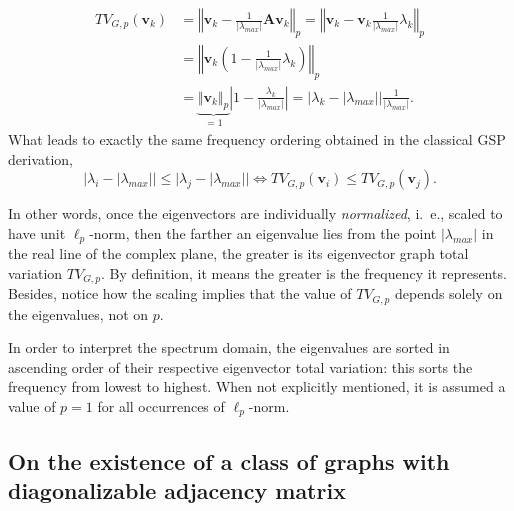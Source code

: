 \begin{equation}
    \begin{aligned}
        TV_{G, p}(\mathbf{v}_k) & =
        \left\Vert \mathbf{v}_k - \frac{1}{|\lambda_{max}|} \mathbf{A} \mathbf{v}_k \right\Vert_p =
        \left\Vert\mathbf{v}_k - \mathbf{v}_k \frac{1}{|\lambda_{max}|} \lambda_k \right\Vert_p                                  \\
                                & = \left\Vert\mathbf{v}_k \left( 1 -  \frac{1}{|\lambda_{max}|} \lambda_k \right) \right\Vert_p \\
                                & =
        \underbrace{\Vert \mathbf{v}_k \Vert_p}_{= 1} \left|1 - \frac{\lambda_k}{|\lambda_{max}|}\right| = \Big| \lambda_k - |\lambda_{max}| \Big| \frac{1}{|\lambda_{max}|}.
    \end{aligned}
\end{equation}
What leads to exactly the same frequency ordering obtained in the classical GSP derivation,
\begin{equation}
    \label{eq:TV_ordering_q}
    \Big| \! \lambda_i  - \! |\lambda_{max}|\Big| \! \leq \! \Big|  \lambda_j  - \! |\lambda_{max}|\Big| \! \! \iff \! \! TV_{G, p}(\mathbf{v}_i) \leq TV_{G, p}(\mathbf{v}_j).
\end{equation}

In other words, once the eigenvectors are individually \textit{normalized}, i.~e., scaled to have unit $\ell_p$-norm, then the farther an eigenvalue lies from the point $|\lambda_{max}|$ in the real line of the complex plane, the greater is its eigenvector graph total variation $TV_{G, p}$. By definition, it means the greater is the frequency it represents. Besides, notice how the scaling implies that the value of $TV_{G, p}$ depends solely on the eigenvalues, not on $p$.

In order to interpret the spectrum domain, the eigenvalues are sorted in ascending order of their respective eigenvector total variation: this sorts the frequency from lowest to highest. When not explicitly mentioned, it is assumed a value of $p = 1$ for all occurrences of $\ell_p$-norm.

\subsection{On the existence of a class of graphs with diagonalizable adjacency matrix}

